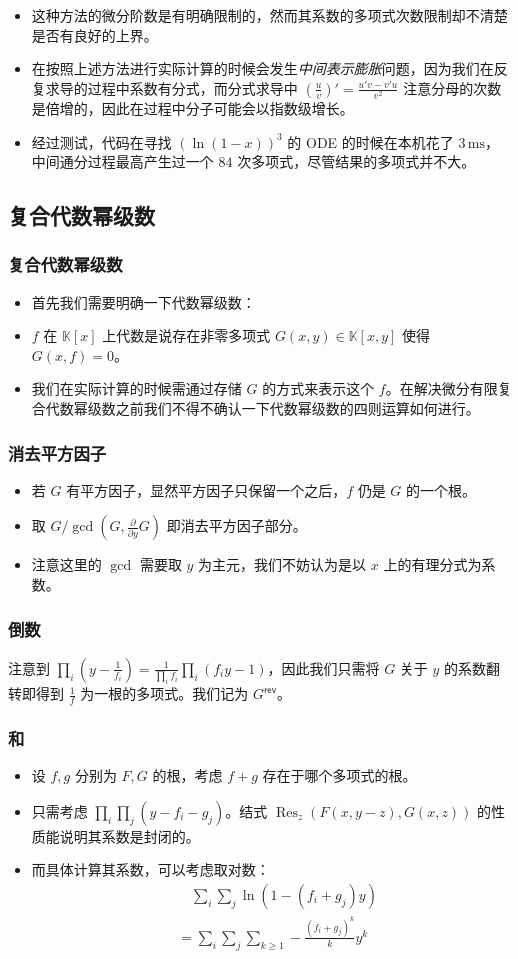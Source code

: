 \documentclass[mathserif]{ctexbeamer}
\providecommand*{\unit}[1]{\ensuremath{\mathrm{\,#1}}}
\newcommand{\rev}{\mathsf{rev}}
\DeclareMathOperator{\Res}{\mathrm{Res}}
\begin{document}
\frame
{
  \begin{itemize}
    \item<1-> 这种方法的微分阶数是有明确限制的，然而其系数的多项式次数限制却不清楚是否有良好的上界。
    \item<2-> 在按照上述方法进行实际计算的时候会发生\emph{中间表示膨胀}问题，因为我们在反复求导的过程中系数有分式，而分式求导中 $\left(\frac uv\right)'=\frac{u'v-v'u}{v^2}$ 注意分母的次数是倍增的，因此在过程中分子可能会以指数级增长。
    \item<3-> 经过测试，代码在寻找 $(\ln(1-x))^3$ 的 ODE 的时候在本机花了 $3\unit{ms}$，中间通分过程最高产生过一个 $84$ 次多项式，尽管结果的多项式并不大。
  \end{itemize}
}

\subsection{复合代数幂级数}

\frame
{
  \frametitle{复合代数幂级数}
  
  \begin{itemize}
  \item<1-> 首先我们需要明确一下代数幂级数：
  \item<2-> $f$ 在 $\mathbb K[x]$ 上代数是说存在非零多项式 $G(x,y)\in \mathbb K[x,y]$ 使得 $G(x, f)=0$。
  \item<3-> 我们在实际计算的时候需通过存储 $G$ 的方式来表示这个 $f$。在解决微分有限复合代数幂级数之前我们不得不确认一下代数幂级数的四则运算如何进行。
  \end{itemize}
}

\frame
{
  \frametitle{消去平方因子}
  
  \begin{itemize}
  \item<1-> 若 $G$ 有平方因子，显然平方因子只保留一个之后，$f$ 仍是 $G$ 的一个根。
  \item<2-> 取 $G / \gcd (G, \frac{\partial}{\partial y} G)$ 即消去平方因子部分。
  \item<3-> 注意这里的 $\gcd$ 需要取 $y$ 为主元，我们不妨认为是以 $x$ 上的有理分式为系数。
  \end{itemize}
}

\frame
{
  \frametitle{倒数}
  
  注意到 $\prod_i(y-\frac 1{f_i}) = \frac1{\prod_i f_i}\prod_i (f_i y-1)$，因此我们只需将 $G$ 关于 $y$ 的系数翻转即得到 $\frac 1f$ 为一根的多项式。我们记为 $G^\rev$。
}

\frame
{
  \frametitle{和}
  
  \begin{itemize}
  \item<1-> 设 $f,g$ 分别为 $F,G$ 的根，考虑 $f+g$ 存在于哪个多项式的根。
  \item<2-> 只需考虑 $\prod_i\prod_j(y-f_i-g_j)$。结式 $\Res_z (F(x,y-z),G(x,z))$ 的性质能说明其系数是封闭的。
  \item<3-> 而具体计算其系数，可以考虑取对数：
  \begin{align*}
  &\quad \sum_i\sum_j \ln (1 - (f_i+g_j)y)\\
  &= \sum_i\sum_j \sum_{k\ge 1}  - \frac{(f_i+g_j)^k}k y^k
\end{align*}
  \end{itemize}
}
\end{document}
